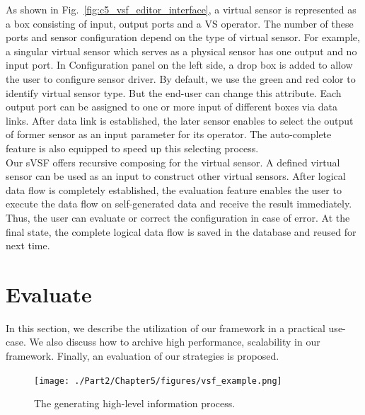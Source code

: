 As shown in Fig.~\ref{fig:c5_vsf_editor_interface}, a virtual sensor is represented as a box consisting of input, output ports and a VS operator. The number of these ports and sensor configuration depend on the type of virtual sensor. For example, a singular virtual sensor which serves as a physical sensor has one output and no input port. In Configuration panel on the left side, a drop box is added to allow the user to configure sensor driver. By default, we use the green and red color to identify virtual sensor type. But the end-user can change this attribute. Each output port can be assigned to one or more input of different boxes via data links. After data link is established, the later sensor enables to select the output of former sensor as an input parameter for its operator. The auto-complete feature is also equipped to speed up this selecting process. \\

Our sVSF offers recursive composing for the virtual sensor. A defined virtual sensor can be used as an input to construct other virtual sensors. After logical data flow is completely established, the evaluation feature enables the user to execute the data flow on self-generated data and receive the result immediately. Thus, the user can evaluate or correct the configuration in case of error. At the final state, the complete logical data flow is saved in the database and reused for next time.


\section{Evaluate}
In this section, we describe the utilization of our framework in a practical use-case. We also discuss how to archive high performance, scalability in our framework. Finally, an evaluation of our strategies is proposed.\\

\begin{figure}[h!] 
 \begin{center} 
 \texttt{[image: ./Part2/Chapter5/figures/vsf\_example.png]} 
    \caption{The generating high-level information process.}
     \label{fig:c5_vsf_example}
  \end{center} 
\end{figure}

